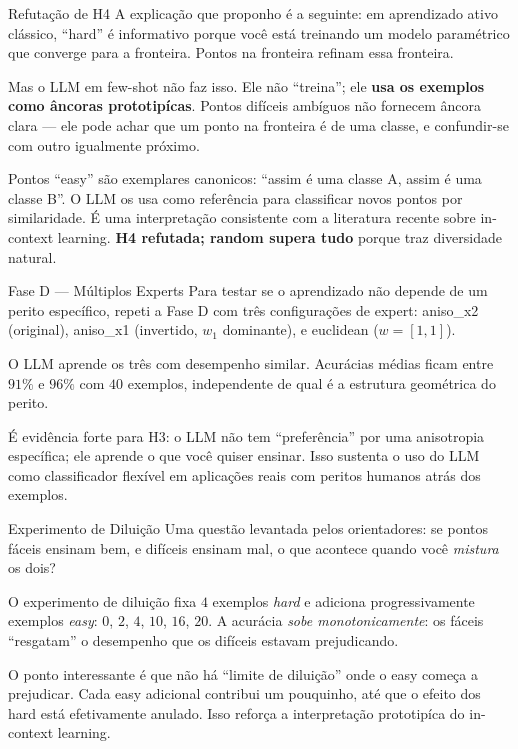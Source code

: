 \documentclass[aspectratio=169,10pt]{beamer}
\begin{document}
\begin{frame}{Refuta\c{c}\~ao de H4}
  \small
  A explica\c{c}\~ao que proponho \'e a seguinte: em aprendizado ativo cl\'assico, ``hard'' \'e
  informativo porque voc\^e est\'a treinando um modelo param\'etrico que converge para a fronteira.
  Pontos na fronteira refinam essa fronteira.
  \medskip

  Mas o LLM em few-shot n\~ao faz isso. Ele n\~ao ``treina''; ele \textbf{usa os exemplos como \^ancoras
  prototip\'icas}. Pontos dif\'iceis amb\'iguos n\~ao fornecem \^ancora clara --- ele pode achar que um
  ponto na fronteira \'e de uma classe, e confundir-se com outro igualmente pr\'oximo.
  \medskip

  Pontos ``easy'' s\~ao exemplares canonicos: ``assim \'e uma classe A, assim \'e uma classe B''.
  O LLM os usa como refer\^encia para classificar novos pontos por similaridade. \'E uma interpreta\c{c}\~ao
  consistente com a literatura recente sobre in-context learning. \textbf{H4 refutada; random supera
  tudo} porque traz diversidade natural.
\end{frame}

\begin{frame}{Fase D --- M\'ultiplos Experts}
  \small
  Para testar se o aprendizado n\~ao depende de um perito espec\'ifico, repeti a Fase D com tr\^es
  configura\c{c}\~oes de expert: aniso\_x2 (original), aniso\_x1 (invertido, $w_1$ dominante), e
  euclidean ($w = [1, 1]$).
  \medskip

  O LLM aprende os tr\^es com desempenho similar. Acur\'acias m\'edias ficam entre $91\%$ e $96\%$ com
  $40$ exemplos, independente de qual \'e a estrutura geom\'etrica do perito.
  \medskip

  \'E evid\^encia forte para H3: o LLM n\~ao tem ``prefer\^encia'' por uma anisotropia espec\'ifica;
  ele aprende o que voc\^e quiser ensinar. Isso sustenta o uso do LLM como classificador flex\'ivel em
  aplica\c{c}\~oes reais com peritos humanos atr\'as dos exemplos.
\end{frame}

\begin{frame}{Experimento de Dilui\c{c}\~ao}
  \small
  Uma quest\~ao levantada pelos orientadores: se pontos f\'aceis ensinam bem, e dif\'iceis ensinam mal,
  o que acontece quando voc\^e \emph{mistura} os dois?
  \medskip

  O experimento de dilui\c{c}\~ao fixa $4$ exemplos \emph{hard} e adiciona progressivamente exemplos
  \emph{easy}: $0$, $2$, $4$, $10$, $16$, $20$. A acur\'acia \emph{sobe monotonicamente}: os f\'aceis
  ``resgatam'' o desempenho que os dif\'iceis estavam prejudicando.
  \medskip

  O ponto interessante \'e que n\~ao h\'a ``limite de dilui\c{c}\~ao'' onde o easy come\c{c}a a prejudicar.
  Cada easy adicional contribui um pouquinho, at\'e que o efeito dos hard est\'a efetivamente anulado.
  Isso refor\c{c}a a interpreta\c{c}\~ao prototip\'ica do in-context learning.
\end{frame}
\end{document}
